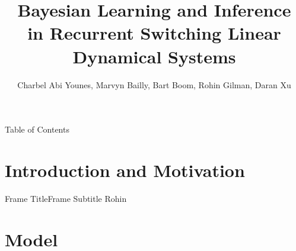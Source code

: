 \documentclass{beamer}
\title[RSLDS]{\small Bayesian Learning and Inference \\ in Recurrent Switching Linear Dynamical Systems}
\author{Charbel Abi Younes, Marvyn Bailly, Bart Boom, Rohin Gilman, Daran Xu}
\begin{document}
\begin{frame}
    \maketitle
\end{frame}

\begin{frame}{Table of Contents}
    \setcounter{framenumber}{1} %
    \tableofcontents
\end{frame}

\section{Introduction and Motivation}

\begin{frame}{Frame Title}{Frame Subtitle}
        Rohin

    \end{frame}

\section{Model}
\end{document}
